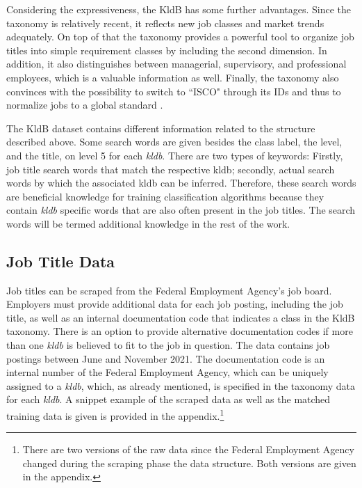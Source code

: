 \documentclass[12pt, a4paper, titlepage]{article}
\begin{document}
Considering the expressiveness, the \ac{KldB} has some further advantages. Since the taxonomy is relatively recent, it reflects new job classes and market trends adequately. On top of that the taxonomy provides a powerful tool to organize job titles into simple requirement classes by including the second dimension. In addition, it also distinguishes between managerial, supervisory, and professional employees, which is a valuable information as well. Finally, the taxonomy also convinces with the possibility to switch to ``\ac{ISCO}" through its IDs and thus to normalize jobs to a global standard \citep{Bundesagentur2011b}. 
  
The \ac{KldB} dataset contains different information related to the structure described above. Some search words are given besides the class label, the level, and the title, on level 5 for each \textit{kldb}. 
There are two types of keywords: Firstly, job title search words that match the respective kldb; secondly, actual search words by which the associated kldb can be inferred. Therefore, these search words are beneficial knowledge for training classification algorithms because they contain \textit{kldb} specific words that are also often present in the job titles. The search words will be termed additional knowledge in the rest of the work. 

 
\subsection{Job Title Data}
Job titles can be scraped from the Federal Employment Agency's job board. Employers must provide additional data for each job posting, including the job title, as well as an internal documentation code that indicates a class in the \ac{KldB} taxonomy. There is an option to provide alternative documentation codes if more than one \textit{kldb} is believed to fit to the job in question. The data contains job postings between June and November 2021. The documentation code is an internal number of the Federal Employment Agency, which can be uniquely assigned to a \textit{kldb}, which, as already mentioned, is specified in the taxonomy data for each \textit{kldb}. A snippet example of the scraped data as well as the matched training data is given is provided in the appendix.\footnote{There are two versions of the raw data since the Federal Employment Agency changed during the scraping phase the data structure. Both versions are given in the appendix.}
\end{document}
